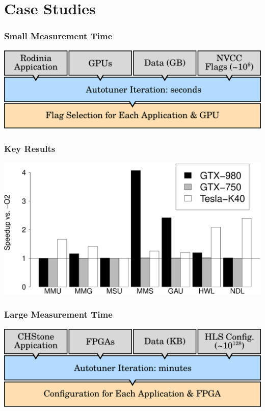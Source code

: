 \documentclass[10pt, compress, aspectratio=169]{beamer}
\begin{document}
\section{Case Studies}

\begin{frame}
    \frametitle{Small Measurement Time}
    \begin{center}
        \includegraphics[width=.9\textwidth]{overview_gpus}
    \end{center}
\end{frame}

\begin{frame}
    \frametitle{Key Results}
    \begin{center}
        \includegraphics[width=.9\textwidth]{GPU-tuning-summary}
    \end{center}
\end{frame}

\begin{frame}
    \frametitle{Large Measurement Time}
    \begin{center}
        \includegraphics[width=.9\textwidth]{overview_fpgas_small}
    \end{center}
\end{frame}
\end{document}
